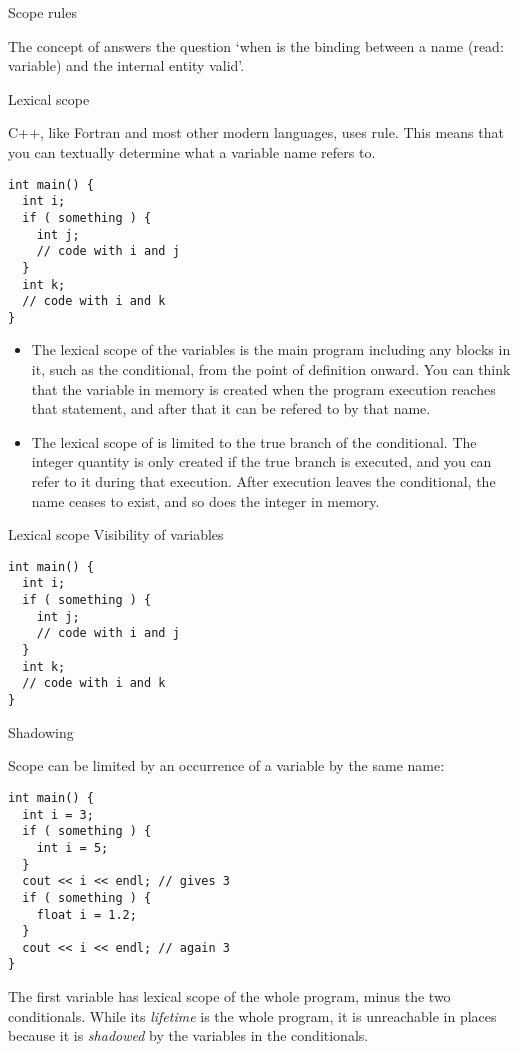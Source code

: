 
 {Scope rules}

The concept of  answers the question `when is the
binding between a name (read: variable) and the internal entity valid'.

 {Lexical scope}

C++, like Fortran and most other modern languages, uses
 rule. This means that you can textually
determine what a variable name refers to.
\begin{verbatim}
int main() {
  int i;
  if ( something ) {
    int j;
    // code with i and j
  }
  int k;
  // code with i and k
}
\end{verbatim}
\begin{itemize}
\item The lexical scope of the variables  is the main program
  including any blocks in it, such as the conditional, from the point
  of definition onward. You can think that the variable in memory is
  created when the program execution reaches that statement, and after
  that it can be refered to by that name.
\item The lexical scope of  is limited to the true branch of the
  conditional. The integer quantity is only created if the true branch
  is executed, and you can refer to it during that execution. After
  execution leaves the conditional, the name ceases to exist, and so
  does the integer in memory.
\end{itemize}

\begin{slide}{Lexical scope}
  \label{sl:lexical}
  Visibility of variables
\begin{verbatim}
int main() {
  int i;
  if ( something ) {
    int j;
    // code with i and j
  }
  int k;
  // code with i and k
}
\end{verbatim}  
\end{slide}
 {Shadowing}

Scope can be limited by an occurrence of a variable by the same name:
\begin{verbatim}
int main() {
  int i = 3;
  if ( something ) {
    int i = 5;
  }
  cout << i << endl; // gives 3
  if ( something ) {
    float i = 1.2;
  }
  cout << i << endl; // again 3
}
\end{verbatim}
The first variable  has lexical scope of the whole program, minus
the two conditionals. While its
\emph{lifetime} is the whole program, it is
unreachable in places because it is
\emph{shadowed} by the variables  in the conditionals.

